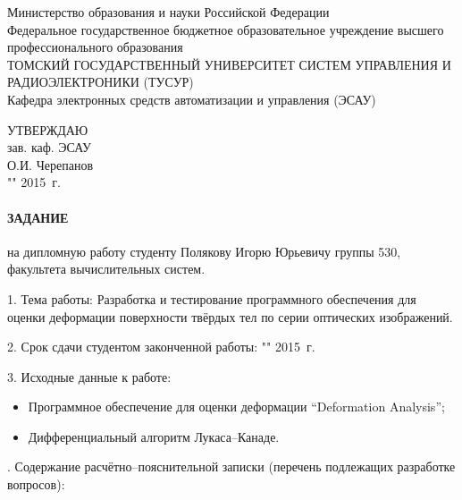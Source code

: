 \newpage
{}

\begin{center}
 Министерство образования и науки Российской Федерации\\
 Федеральное государственное бюджетное образовательное учреждение высшего профессионального образования\\
 ТОМСКИЙ ГОСУДАРСТВЕННЫЙ УНИВЕРСИТЕТ СИСТЕМ УПРАВЛЕНИЯ И РАДИОЭЛЕКТРОНИКИ (ТУСУР)\\
 Кафедра электронных средств автоматизации и управления (ЭСАУ)\\
\end{center}

\begin{flushright}
 \begin{minipage}{0.4\textwidth}
  УТВЕРЖДАЮ \\
  зав. каф. ЭСАУ \\
  \underline{\hspace{2.5cm}}О.И. Черепанов \\
  "\underline{\hspace{1cm}}"\underline{\hspace{3cm}} 2015~г.
 \end{minipage}
\end{flushright}


\paragraph*{\hfill ЗАДАНИЕ \hfill}

на дипломную работу студенту Полякову Игорю Юрьевичу группы 530, факультета вычислительных систем.

1. Тема работы: Разработка и тестирование программного обеспечения для оценки деформации поверхности твёрдых тел по серии оптических изображений.

2. Срок сдачи студентом законченной работы: "\underline{\hspace{1cm}}"\underline{\hspace{3cm}} 2015~г.

3. Исходные данные к работе:

\begin{itemize}
 \item Программное обеспечение для оценки деформации ``Deformation Analysis'';
 \item Дифференциальный алгоритм Лукаса--Канаде.
\end{itemize}
. Содержание расчётно--пояснительной записки (перечень подлежащих разработке вопросов):

